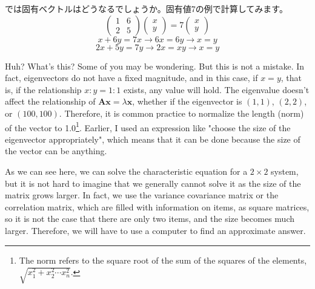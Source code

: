 \documentclass{ltjsbook}
\begin{document}
では固有ベクトルはどうなるでしょうか。固有値7の例で計算してみます。
\[ \begin{pmatrix} 1 & 6 \\ 2 & 5 \end{pmatrix}\begin{pmatrix} x\\y\end{pmatrix} = 7 \begin{pmatrix} x\\y\end{pmatrix} \]
\[ x + 6y = 7x \to 6x = 6y \to x=y \]
\[ 2x+5y = 7y \to 2x = xy \to x=y \]

Huh? What's this? Some of you may be wondering. But this is not a mistake. In fact, eigenvectors do not have a fixed magnitude, and in this case, if $x=y$, that is, if the relationship $x:y=1:1$ exists, any value will hold.
The eigenvalue doesn't affect the relationship of $\bm{Ax} = \lambda \bm{x}$, whether if the eigenvector is $(1,1)$, $(2,2)$, or $(100,100)$. Therefore, it is common practice to normalize the length (norm) of the vector to 1.0\footnote{The norm refers to the square root of the sum of the squares of the elements, $\sqrt{x_1^2 + x_2^2 \cdots x_n^2}$.}.
Earlier, I used an expression like "choose the size of the eigenvector appropriately", which means that it can be done because the size of the vector can be anything.

As we can see here, we can solve the characteristic equation for a $2\times2$ system, but it is not hard to imagine that we generally cannot solve it as the size of the matrix grows larger. In fact, we use the variance covariance matrix or the correlation matrix, which are filled with information on items, as square matrices, so it is not the case that there are only two items, and the size becomes much larger. Therefore, we will have to use a computer to find an approximate answer.
\end{document}
